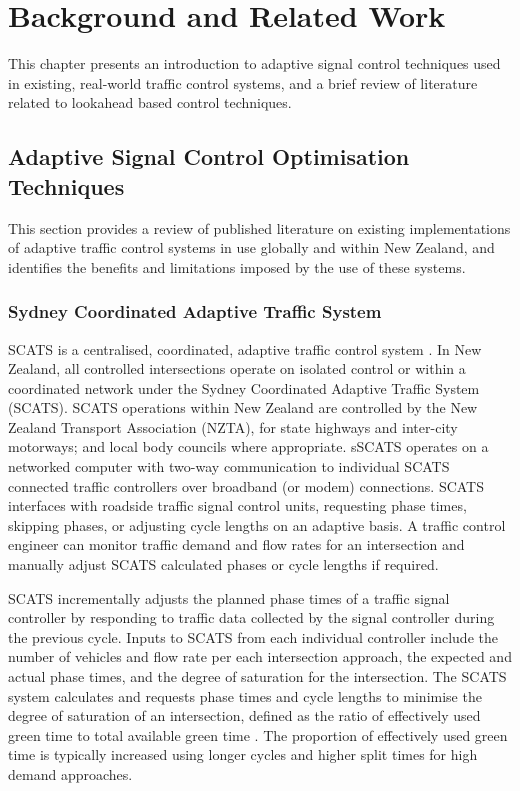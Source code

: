 \chapter{Background and Related Work}

This chapter presents an introduction to adaptive signal control techniques used in existing, real-world traffic control systems, and a brief review of literature related to lookahead based control techniques. 

\section{Adaptive Signal Control Optimisation Techniques}

This section provides a review of published literature on existing implementations of adaptive traffic control systems in use globally and within New Zealand, and identifies the benefits and limitations imposed by the use of these systems.

\subsection{Sydney Coordinated Adaptive Traffic System}

SCATS is a centralised, coordinated, adaptive traffic control system \cite{lowrie1982scats}. In New Zealand, all controlled intersections operate on isolated control or within a coordinated network under the Sydney Coordinated Adaptive Traffic System (SCATS). SCATS operations within New Zealand are controlled by the New Zealand Transport Association (NZTA), for state highways and inter-city motorways; and local body councils where appropriate. sSCATS operates on a networked computer with two-way communication to individual SCATS connected traffic controllers over broadband (or modem) connections. SCATS interfaces with roadside traffic signal control units, requesting phase times, skipping phases, or adjusting cycle lengths on an adaptive basis. A traffic control engineer can monitor traffic demand and flow rates for an intersection and manually adjust SCATS calculated phases or cycle lengths if required.

SCATS incrementally adjusts the planned phase times of a traffic signal controller by responding to traffic data collected by the signal controller during the previous cycle. Inputs to SCATS from each individual controller include the number of vehicles and flow rate per each intersection approach, the expected and actual phase times, and the degree of saturation for the intersection.  The SCATS system calculates and requests phase times and cycle lengths to minimise the degree of saturation of an intersection, defined as the ratio of effectively used green time to total available green time \cite{wolshon1999scats}. The proportion of effectively used green time is typically increased using longer cycles and higher split times for high demand approaches. 

